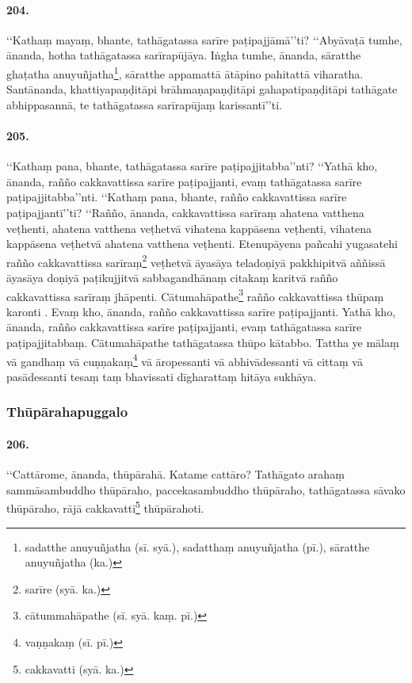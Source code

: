 \paragraph{204.} ‘‘Kathaṃ mayaṃ, bhante, tathāgatassa sarīre paṭipajjāmā’’ti? ‘‘Abyāvaṭā tumhe, ānanda, hotha tathāgatassa sarīrapūjāya. Iṅgha tumhe, ānanda, sāratthe ghaṭatha anuyuñjatha\footnote{sadatthe anuyuñjatha (sī. syā.), sadatthaṃ anuyuñjatha (pī.), sāratthe anuyuñjatha (ka.)}, sāratthe appamattā ātāpino pahitattā viharatha. Santānanda, khattiyapaṇḍitāpi brāhmaṇapaṇḍitāpi gahapatipaṇḍitāpi tathāgate abhippasannā, te tathāgatassa sarīrapūjaṃ karissantī’’ti.

\paragraph{205.} ‘‘Kathaṃ pana, bhante, tathāgatassa sarīre paṭipajjitabba’’nti? ‘‘Yathā kho, ānanda, rañño cakkavattissa sarīre paṭipajjanti, evaṃ tathāgatassa sarīre paṭipajjitabba’’nti. ‘‘Kathaṃ pana, bhante, rañño cakkavattissa sarīre paṭipajjantī’’ti? ‘‘Rañño, ānanda, cakkavattissa sarīraṃ ahatena vatthena veṭhenti, ahatena vatthena veṭhetvā vihatena kappāsena veṭhenti, vihatena kappāsena veṭhetvā ahatena vatthena veṭhenti. Etenupāyena pañcahi yugasatehi rañño cakkavattissa sarīraṃ\footnote{sarīre (syā. ka.)} veṭhetvā āyasāya teladoṇiyā pakkhipitvā aññissā āyasāya doṇiyā paṭikujjitvā sabbagandhānaṃ citakaṃ karitvā rañño cakkavattissa sarīraṃ jhāpenti. Cātumahāpathe\footnote{cātummahāpathe (sī. syā. kaṃ. pī.)} rañño cakkavattissa thūpaṃ karonti . Evaṃ kho, ānanda, rañño cakkavattissa sarīre paṭipajjanti. Yathā kho, ānanda, rañño cakkavattissa sarīre paṭipajjanti, evaṃ tathāgatassa sarīre paṭipajjitabbaṃ. Cātumahāpathe tathāgatassa thūpo kātabbo. Tattha ye mālaṃ vā gandhaṃ vā cuṇṇakaṃ\footnote{vaṇṇakaṃ (sī. pī.)} vā āropessanti vā abhivādessanti vā cittaṃ vā pasādessanti tesaṃ taṃ bhavissati dīgharattaṃ hitāya sukhāya.

\subsubsection{Thūpārahapuggalo}

\paragraph{206.} ‘‘Cattārome, ānanda, thūpārahā. Katame cattāro? Tathāgato arahaṃ sammāsambuddho thūpāraho, paccekasambuddho thūpāraho, tathāgatassa sāvako thūpāraho, rājā cakkavattī\footnote{cakkavatti (syā. ka.)} thūpārahoti.

